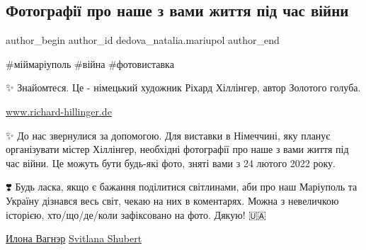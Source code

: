  
 
 
 
 

\subsection{Фотографії про наше з вами життя під час війни}
\label{sec:30_01_2023.fb.dedova_natalia.mariupol.1.fotograf__pro_nashe}

\ifcmt
 author_begin
   author_id dedova_natalia.mariupol
 author_end
\fi

\#міймаріуполь
\#війна
\#фотовиставка

✨ Знайомтеся. Це - німецький художник Ріхард Хіллінгер, автор Золотого голуба. 

\url{www.richard-hillinger.de}

✨ До нас звернулися за допомогою. Для виставки в Німеччині, яку планує
організувати містер Хіллінгер, необхідні фотографії про наше з вами життя під
час війни. Це можуть бути будь-які фото, зняті вами з 24 лютого 2022 року. 

❣️ Будь ласка, якщо є бажання поділитися світлинами, аби про наш Маріуполь та
Україну дізнався весь світ, чекаю на них в коментарях. Можна з невеличкою
історією, хто/що/де/коли зафіксовано на фото. Дякую! 🇺🇦

\href{https://www.facebook.com/IlonaRommanova}{Илона Вагнэр}
\href{https://www.facebook.com/profile.php?id=100024229293185}{Svitlana Shubert}



